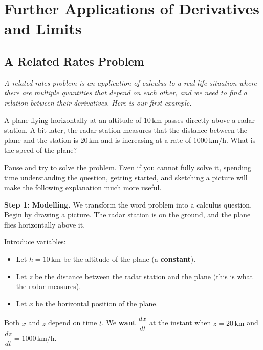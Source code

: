 \chapter{Further Applications of Derivatives and Limits}

\section{A Related Rates Problem}
\label{sec:6.1}

\textit{A related rates problem is an application of calculus to a real-life situation where there are multiple quantities that depend on each other, and we need to find a relation between their derivatives.  Here is our first example.}

\begin{example}
\label{ex:6-1}
A plane flying horizontally at an altitude of $10\,\text{km}$ passes directly above a radar station.  A bit later, the radar station measures that the distance between the plane and the station is $20\,\text{km}$ and is increasing at a rate of $1000\,\text{km/h}$.  What is the speed of the plane?
\end{example}

\begin{remark}
Pause and try to solve the problem.  Even if you cannot fully solve it, spending time understanding the question, getting started, and sketching a picture will make the following explanation much more useful.
\end{remark}

\textbf{Step 1: Modelling.}  We transform the word problem into a calculus question.  Begin by drawing a picture.  The radar station is on the ground, and the plane flies horizontally above it.

Introduce variables:
\begin{itemize}
  \item Let $h = 10\,\text{km}$ be the altitude of the plane (a \textbf{constant}).
  \item Let $z$ be the distance between the radar station and the plane (this is what the radar measures).
  \item Let $x$ be the horizontal position of the plane.
\end{itemize}
Both $x$ and $z$ depend on time $t$.  We \textbf{want} $\dfrac{dx}{dt}$ at the instant when $z = 20\,\text{km}$ and $\dfrac{dz}{dt} = 1000\,\text{km/h}$.


